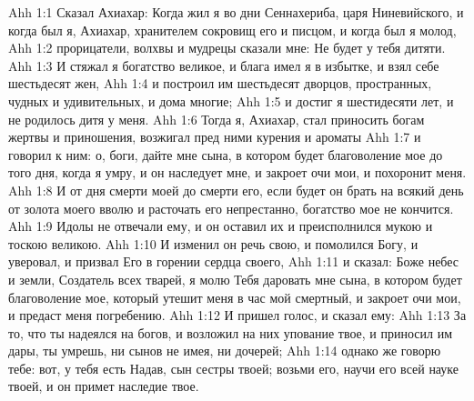 \vs Ahh 1:1
Сказал Ахиахар: Когда жил я во дни Сеннахериба, царя Ниневийского, и когда был я, Ахиахар, хранителем сокровищ его и писцом, и когда был я молод,
\vs Ahh 1:2
прорицатели, волхвы и мудрецы сказали мне: Не будет у тебя дитяти.
\vs Ahh 1:3
И стяжал я богатство великое, и блага имел я в избытке, и взял себе шестьдесят жен,
\vs Ahh 1:4
и построил им шестьдесят дворцов, пространных, чудных и удивительных, и дома многие;
\vs Ahh 1:5
и достиг я шестидесяти лет, и не родилось дитя у меня.
\vs Ahh 1:6
Тогда я, Ахиахар, стал приносить богам жертвы и приношения, возжигал пред ними курения и ароматы
\vs Ahh 1:7
и говорил к ним: о, боги, дайте мне сына, в котором будет благоволение мое до того дня, когда я умру, и он наследует мне, и закроет очи мои, и похоронит меня.
\vs Ahh 1:8
И от дня смерти моей до смерти его, если будет он брать на всякий день от золота моего вволю и расточать его непрестанно, богатство мое не кончится.
\vs Ahh 1:9
Идолы не отвечали ему, и он оставил их и преисполнился мукою и тоскою великою.
\vs Ahh 1:10
И изменил он речь свою, и помолился Богу, и уверовал, и призвал Его в горении сердца своего,
\vs Ahh 1:11
и сказал: Боже небес и земли, Создатель всех тварей, я молю Тебя даровать мне сына, в котором будет благоволение мое, который утешит меня в час мой смертный, и закроет очи мои, и предаст меня погребению.
\vs Ahh 1:12
И пришел голос, и сказал ему:
\vs Ahh 1:13
За то, что ты надеялся на богов, и возложил на них упование твое, и приносил им дары, ты умрешь, ни сынов не имея, ни дочерей;
\vs Ahh 1:14
однако же говорю тебе: вот, у тебя есть Надав, сын сестры твоей; возьми его, научи его всей науке твоей, и он примет наследие твое.

